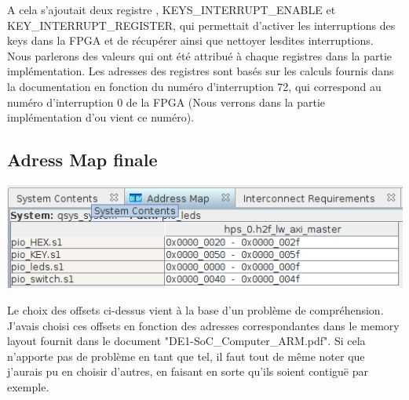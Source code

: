 A cela s'ajoutait deux registre , KEYS\_INTERRUPT\_ENABLE et\\ KEY\_INTERRUPT\_REGISTER, qui permettait d'activer les interruptions des keys dans la FPGA et de récupérer ainsi que nettoyer lesdites interruptions.\\

Nous parlerons des valeurs qui ont été attribué à chaque registres dans la partie implémentation. Les adresses des registres sont basés sur les calculs fournis dans la documentation en fonction du numéro d'interruption 72, qui correspond au numéro d'interruption 0 de la FPGA (Nous verrons dans la partie implémentation d'ou vient ce numéro).

\subsection{Adress Map finale}

\includegraphics[scale=0.6]{./images/address_map.png}
\par
Le choix des offsets ci-dessus vient à la base d'un problème de compréhension. J'avais choisi ces offsets en fonction des adresses correspondantes dans le memory layout fournit dans le document "DE1-SoC\_Computer\_ARM.pdf". Si cela n'apporte pas de problème en tant que tel, il faut tout de même noter que j'aurais pu en choisir d'autres, en faisant en sorte qu'ils soient contiguë par exemple.

